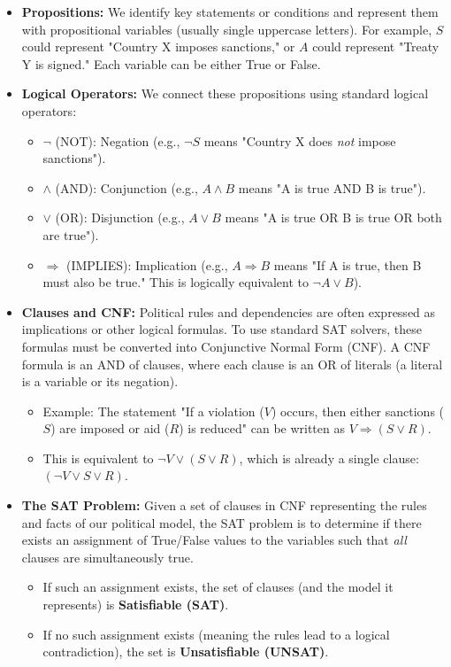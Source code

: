 \documentclass[11pt, a4paper]{article}
\begin{document}
\begin{itemize}
    \item \textbf{Propositions:} We identify key statements or conditions and represent them with propositional variables (usually single uppercase letters). For example, $S$ could represent "Country X imposes sanctions," or $A$ could represent "Treaty Y is signed." Each variable can be either True or False.
    \item \textbf{Logical Operators:} We connect these propositions using standard logical operators:
    \begin{itemize}
        \item $\neg$ (NOT): Negation (e.g., $\neg S$ means "Country X does \textit{not} impose sanctions").
        \item $\wedge$ (AND): Conjunction (e.g., $A \wedge B$ means "A is true AND B is true").
        \item $\vee$ (OR): Disjunction (e.g., $A \vee B$ means "A is true OR B is true OR both are true").
        \item $\Rightarrow$ (IMPLIES): Implication (e.g., $A \Rightarrow B$ means "If A is true, then B must also be true." This is logically equivalent to $\neg A \vee B$).
    \end{itemize}
    \item \textbf{Clauses and CNF:} Political rules and dependencies are often expressed as implications or other logical formulas. To use standard SAT solvers, these formulas must be converted into Conjunctive Normal Form (CNF). A CNF formula is an AND of clauses, where each clause is an OR of literals (a literal is a variable or its negation).
        \begin{itemize}
            \item Example: The statement "If a violation ($V$) occurs, then either sanctions ($S$) are imposed or aid ($R$) is reduced" can be written as $V \Rightarrow (S \vee R)$.
            \item This is equivalent to $\neg V \vee (S \vee R)$, which is already a single clause: $(\neg V \vee S \vee R)$.
        \end{itemize}
    \item \textbf{The SAT Problem:} Given a set of clauses in CNF representing the rules and facts of our political model, the SAT problem is to determine if there exists an assignment of True/False values to the variables such that \textit{all} clauses are simultaneously true.
    \begin{itemize}
        \item If such an assignment exists, the set of clauses (and the model it represents) is \textbf{Satisfiable (SAT)}.
        \item If no such assignment exists (meaning the rules lead to a logical contradiction), the set is \textbf{Unsatisfiable (UNSAT)}.
    \end{itemize}
\end{itemize}
\end{document}
